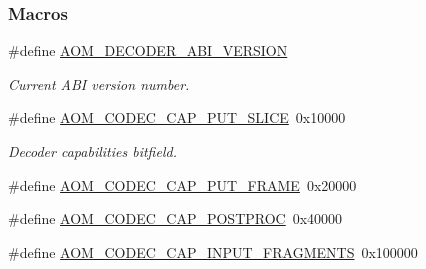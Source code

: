 \subsubsection*{Macros}
\begin{DoxyCompactItemize}
\item 
\#define \hyperlink{group__decoder_ga23378c7ca8c361c097181aaaa2a5a734}{A\+O\+M\+\_\+\+D\+E\+C\+O\+D\+E\+R\+\_\+\+A\+B\+I\+\_\+\+V\+E\+R\+S\+I\+ON}\hypertarget{group__decoder_ga23378c7ca8c361c097181aaaa2a5a734}{}\label{group__decoder_ga23378c7ca8c361c097181aaaa2a5a734}

\begin{DoxyCompactList}\small\item\em Current A\+BI version number. \end{DoxyCompactList}\item 
\#define \hyperlink{group__decoder_ga1e50f39bf0434fc5d18aeed80e06d044}{A\+O\+M\+\_\+\+C\+O\+D\+E\+C\+\_\+\+C\+A\+P\+\_\+\+P\+U\+T\+\_\+\+S\+L\+I\+CE}~0x10000
\begin{DoxyCompactList}\small\item\em Decoder capabilities bitfield. \end{DoxyCompactList}\item 
\#define \hyperlink{group__decoder_ga667591ede452c5625fcf9345c66514d5}{A\+O\+M\+\_\+\+C\+O\+D\+E\+C\+\_\+\+C\+A\+P\+\_\+\+P\+U\+T\+\_\+\+F\+R\+A\+ME}~0x20000
\item 
\#define \hyperlink{group__decoder_gabcb476dc9748f64ad4a3718419bffc47}{A\+O\+M\+\_\+\+C\+O\+D\+E\+C\+\_\+\+C\+A\+P\+\_\+\+P\+O\+S\+T\+P\+R\+OC}~0x40000
\item 
\#define \hyperlink{group__decoder_ga13b8766c8ad21f41579b7a88a55a87c4}{A\+O\+M\+\_\+\+C\+O\+D\+E\+C\+\_\+\+C\+A\+P\+\_\+\+I\+N\+P\+U\+T\+\_\+\+F\+R\+A\+G\+M\+E\+N\+TS}~0x100000\hypertarget{group__decoder_ga13b8766c8ad21f41579b7a88a55a87c4}{}\label{group__decoder_ga13b8766c8ad21f41579b7a88a55a87c4}


\end{DoxyCompactItemize}
